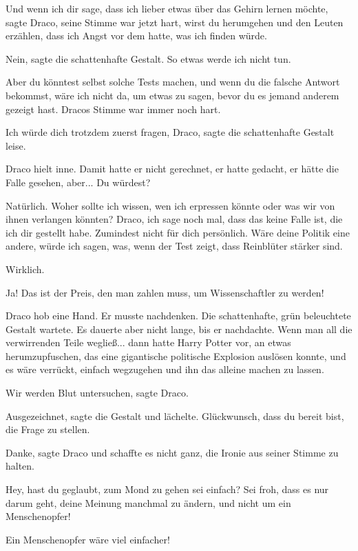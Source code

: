 \glqq Und wenn ich dir sage, dass ich lieber etwas über das Gehirn lernen
möchte\grqq{}, sagte Draco, seine Stimme war jetzt hart, \glqq wirst du
herumgehen und den Leuten erzählen, dass ich Angst vor dem hatte, was ich finden
würde.\grqq{}

\glqq Nein\grqq{}, sagte die schattenhafte Gestalt. \glqq So etwas werde ich
nicht tun.\grqq{}

\glqq Aber du könntest selbst solche Tests machen, und wenn du die falsche
Antwort bekommst, wäre ich nicht da, um etwas zu sagen, bevor du es jemand
anderem gezeigt hast.\grqq{} Dracos Stimme war immer noch hart.

\glqq Ich würde dich trotzdem zuerst fragen, Draco\grqq{}, sagte die
schattenhafte Gestalt leise.

Draco hielt inne. Damit hatte er nicht gerechnet, er hatte gedacht, er hätte die
Falle gesehen, aber... \glqq Du würdest?\grqq{}

\glqq Natürlich. Woher sollte ich wissen, wen ich erpressen könnte oder was wir
von ihnen verlangen könnten? Draco, ich sage noch mal, dass das keine Falle ist,
die ich dir gestellt habe. Zumindest nicht für dich persönlich. Wäre deine
Politik eine andere, würde ich sagen, was, wenn der Test zeigt, dass Reinblüter
stärker sind.\grqq{}

\glqq Wirklich.\grqq{}

\glqq Ja! Das ist der Preis, den man zahlen muss, um Wissenschaftler zu
werden!\grqq{}

Draco hob eine Hand. Er musste nachdenken. Die schattenhafte, grün beleuchtete
Gestalt wartete. Es dauerte aber nicht lange, bis er nachdachte. Wenn man all
die verwirrenden Teile wegließ... dann hatte Harry Potter vor, an etwas
herumzupfuschen, das eine gigantische politische Explosion auslösen konnte, und
es wäre verrückt, einfach wegzugehen und ihn das alleine machen zu lassen.

\glqq Wir werden Blut untersuchen\grqq{}, sagte Draco.

\glqq Ausgezeichnet\grqq{}, sagte die Gestalt und lächelte. \glqq Glückwunsch,
dass du bereit bist, die Frage zu stellen.\grqq{}

\glqq Danke\grqq{}, sagte Draco und schaffte es nicht ganz, die Ironie aus
seiner Stimme zu halten.

\glqq Hey, hast du geglaubt, zum Mond zu gehen sei einfach? Sei froh, dass es
nur darum geht, deine Meinung manchmal zu ändern, und nicht um ein
Menschenopfer!\grqq{}

\glqq Ein Menschenopfer wäre viel einfacher!\grqq{}

